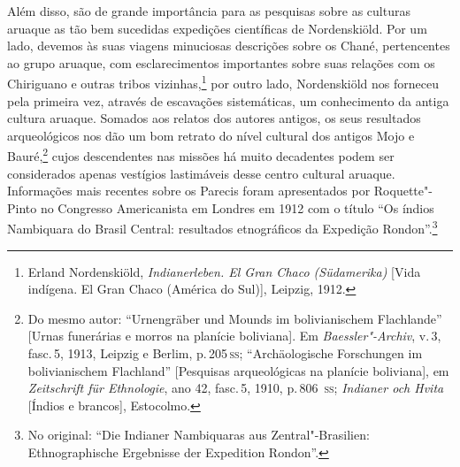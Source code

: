 Além disso, são de grande importância para as pesquisas sobre as
culturas aruaque as tão bem sucedidas expedições científicas de
Nordenskiöld. Por um lado, devemos às suas viagens minuciosas
descrições sobre os Chané, pertencentes ao grupo aruaque, com
esclarecimentos importantes sobre suas relações com os Chiriguano e
outras tribos vizinhas,\footnote{Erland Nordenskiöld,
  \textit{Indianerleben. El Gran Chaco (Südamerika)} {[}Vida indígena. El
  Gran Chaco (América do Sul){]}, Leipzig, 1912.} por outro
lado, Nordenskiöld nos forneceu pela primeira vez, através de escavações
sistemáticas, um conhecimento da antiga cultura aruaque. Somados aos
relatos dos autores antigos, os seus resultados arqueológicos nos dão um
bom retrato do nível cultural dos antigos Mojo e Bauré,\footnote{Do mesmo autor: ``Urnengräber und Mounds im bolivianischem Flachlande'' {[}Urnas funerárias e morros na planície boliviana{]}. Em \textit{Baessler"-Archiv}, v.\,3, fasc.\,5, 1913, Leipzig e Berlim, p.\,205\,\textsc{ss}; ``Archäologische Forschungen im bolivianischem Flachland'' {[}Pesquisas arqueológicas na planície boliviana{]}, em \textit{Zeitschrift für Ethnologie}, ano 42, fasc.\,5, 1910, p.\,806 \,\textsc{ss}; \textit{Indianer och Hvita} {[}Índios e brancos{]}, Estocolmo.} cujos descendentes nas missões há muito decadentes podem ser considerados apenas vestígios lastimáveis desse centro cultural aruaque. Informações mais recentes sobre os Parecis foram apresentados por Roquette"-Pinto no Congresso Americanista em Londres em 1912 com o título ``Os índios Nambiquara do Brasil Central: resultados etnográficos da Expedição Rondon''.\footnote{No original: ``Die Indianer Nambiquaras aus Zentral"-Brasilien: Ethnographische Ergebnisse der Expedition Rondon''.}

